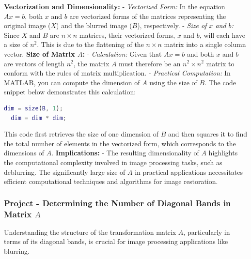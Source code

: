 \documentclass[unicode,11pt,a4paper,oneside,numbers=endperiod,openany]{scrartcl}
\begin{document}
\textbf{Vectorization and Dimensionality:}\newline
- \textit{Vectorized Form:}  In the equation \( Ax = b \), both \( x \) and \( b \) are vectorized forms of the matrices representing the original image (\( X \)) and the blurred image (\( B \)), respectively.
- \textit{Size of \( x \) and \( b \):} Since \( X \) and \( B \) are \( n \times n \) matrices, their vectorized forms, \( x \) and \( b \), will each have a size of \( n^2 \). This is due to the flattening of the \( n \times n \) matrix into a single column vector.
\newline\newline
\textbf{Size of Matrix \( A \):}
- \textit{Calculation:} Given that \( Ax = b \) and both \( x \) and \( b \) are vectors of length \( n^2 \), the matrix \( A \) must therefore be an \( n^2 \times n^2 \) matrix to conform with the rules of matrix multiplication.
- \textit{Practical Computation:} In MATLAB, you can compute the dimension of \( A \) using the size of \( B \). The code snippet below demonstrates this calculation:
  \begin{lstlisting}[language=Matlab]
  dim = size(B, 1);
  dim = dim * dim;
  \end{lstlisting}
  This code first retrieves the size of one dimension of \( B \) and then squares it to find the total number of elements in the vectorized form, which corresponds to the dimensions of \( A \).
\newline\newline
\textbf{Implications:}
- The resulting dimensionality of \( A \) highlights the computational complexity involved in image processing tasks, such as deblurring. The significantly large size of \( A \) in practical applications necessitates efficient computational techniques and algorithms for image restoration.
\newline\newline

                                                                                                                                                                                                                                                             \subsubsection{Project - Determining the Number of Diagonal Bands in Matrix \( A \)}
Understanding the structure of the transformation matrix \( A \), particularly in terms of its diagonal bands, is crucial for image processing applications like blurring.
\end{document}
